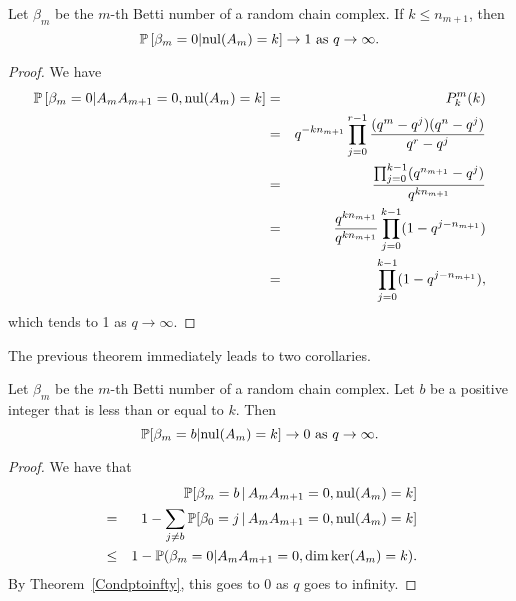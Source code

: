 \begin{theorem}\label{Condptoinfty}
Let $\beta_m$ be the $m$-th Betti number of a random chain complex.  If $k\leq n_{m+1}$, then
\[
\mathbb{P}\left[\beta_m=0| \mathrm{nul}(A_{m}) = k \right] \to 1 \textrm{ as } q\to\infty.
\]
\end{theorem}

\begin{proof}
We have
	\begin{eqnarray*}
	\mathbb{P}\left[\beta_m = 0|A_{m}A_{m+1} = 0, \mathrm{nul}(A_{m}) = k \right]
    &=& P^m_k(k)\\
    &=& q^{-kn_{m+1}}\prod_{j=0}^{r-1} \frac{(q^m-q^j) (q^n - q^j)}{q^r - q^j}  \\
		&=& \frac{\prod_{j=0}^{k-1}(q^{n_{m+1}} - q^j)}
		{q^{kn_{m+1}}} \\
		&=& \frac{q^{kn_{m+1}}}{q^{kn_{m+1}}}\prod_{j=0}^{k-1}(1-q^{j-n_{m+1}})\\
		&=& \prod_{j=0}^{k-1} (1-q^{j-n_{m+1}}),
	\end{eqnarray*}
which tends to 1 as $q\to\infty$.  
\end{proof}

The previous theorem immediately leads to two corollaries.  

\begin{corollary}\label{condtozero}
Let $\beta_m$ be the $m$-th Betti number of a random chain complex. Let $b$ be a positive integer that is less than or equal to $k$. Then 
\[
\mathbb{P}[\beta_m = b| \mathrm{nul}(A_{m}) = k ] \to 0 \textrm{ as } q\to\infty.
\]
\end{corollary}
\begin{proof}
We have that
	\begin{eqnarray*}
	&&\mathbb{P}[\beta_m = b \,|\, A_{m}A_{m+1} = 0, \mathrm{nul}(A_{m}) = k ]\\
    &=& 1 - \sum_{j\neq b}\mathbb{P}[\beta_0 = j \,|\, A_{m}A_{m+1} = 0, \mathrm{nul}(A_{m}) = k ]\\
    &\leq& 1 - \mathbb{P}(\beta_m = 0|A_{m}A_{m+1} = 0, \dim\ker(A_{m}) = k ).
	\end{eqnarray*}
By Theorem~\ref{Condptoinfty}, this goes to $0$ as $q$ goes to infinity.
\end{proof}

